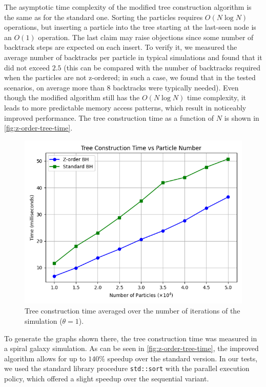 The asymptotic time complexity of the modified tree construction algorithm is the same as for the standard one.
Sorting the particles requires $O(N\log N)$ operations, but inserting a particle into the tree starting at the last-seen node is an $O(1)$ operation.
The last claim may raise objections since some number of backtrack steps are expected on each insert.
To verify it, we measured the average number of backtracks per particle in typical simulations and found that it did not exceed $2.5$ (this can be compared with the number of backtracks required when the particles are not z-ordered; in such a case, we found that in the tested scenarios, on average more than 8 backtracks were typically needed).
Even though the modified algorithm still has the $O(N\log N)$ time complexity, it leads to more predictable memory access patterns, which result in noticeably improved performance.
The tree construction time as a function of $N$ is shown in \autoref{fig:z-order-tree-time}.
\begin{figure}[htp]
    \centering
    \includegraphics[scale=0.5]{chapters/barnes-hut/img/tree_construction_time.png}
    \caption{Tree construction time averaged over the number of iterations of the simulation ($\theta = 1$).}
    \label{fig:z-order-tree-time}
\end{figure}
To generate the graphs shown there, the tree construction time was measured in a spiral galaxy simulation.
As can be seen in \autoref{fig:z-order-tree-time}, the improved algorithm allows for up to $140\%$ speedup over the standard version.
In our tests, we used the standard library procedure \texttt{std::sort} with the parallel execution policy, which offered a slight speedup over the sequential variant.
